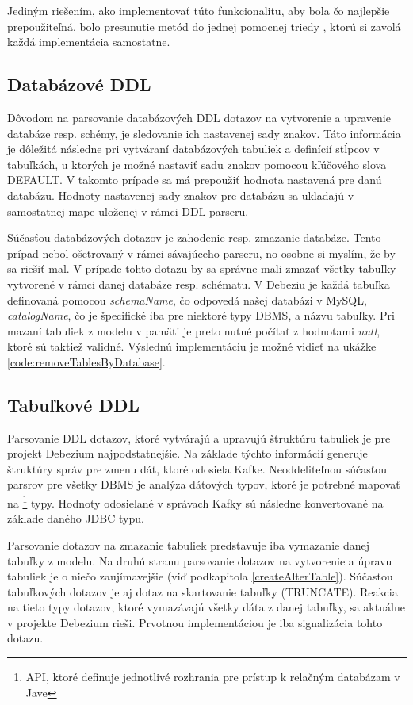 Jediným riešením, ako implementovať túto funkcionalitu, aby bola čo najlepšie prepoužiteľná, bolo presunutie metód do jednej pomocnej triedy , ktorú si zavolá každá implementácia samostatne.

\subsection{Databázové DDL}
Dôvodom na parsovanie databázových DDL dotazov na vytvorenie a upravenie databáze resp. schémy, je sledovanie ich nastavenej sady znakov. Táto informácia je dôležitá následne pri vytváraní databázových tabuliek a definícií stĺpcov v tabuľkách, u ktorých je možné nastaviť sadu znakov pomocou kľúčového slova DEFAULT. V takomto prípade sa má prepoužiť hodnota nastavená pre danú databázu\cite{mysql:reference_manual}. Hodnoty nastavenej sady znakov pre databázu sa ukladajú v samostatnej mape uloženej v rámci DDL parseru.

Súčasťou databázových dotazov je zahodenie resp. zmazanie databáze. Tento prípad nebol ošetrovaný v rámci sávajúceho parseru, no osobne si myslím, že by sa riešiť mal. V prípade tohto dotazu by sa správne mali zmazať všetky tabuľky vytvorené v rámci danej databáze resp. schématu. V Debeziu je každá tabuľka definovaná pomocou \textit{schemaName}, čo odpovedá našej databázi v MySQL, \textit{catalogName}, čo je špecifické iba pre niektoré typy DBMS, a názvu tabuľky. Pri mazaní tabuliek z modelu v pamäti je preto nutné počítať z hodnotami \textit{null}, ktoré sú taktiež validné. Výslednú implementáciu je možné vidieť na ukážke \ref{code:removeTablesByDatabase}.

\subsection{Tabuľkové DDL}
Parsovanie DDL dotazov, ktoré vytvárajú a upravujú štruktúru tabuliek je pre projekt Debezium najpodstatnejšie. Na základe týchto informácií generuje štruktúry správ pre zmenu dát, ktoré odosiela Kafke. Neoddeliteľnou súčasťou parsrov pre všetky DBMS je analýza dátových typov, ktoré je potrebné mapovať na \footnote{API, ktoré definuje jednotlivé rozhrania pre prístup k relačným databázam v Jave} typy. Hodnoty odosielané v správach Kafky sú následne konvertované na základe daného JDBC typu.

Parsovanie dotazov na zmazanie tabuliek predstavuje iba vymazanie danej tabuľky z modelu. Na druhú stranu parsovanie dotazov na vytvorenie a úpravu tabuliek je o niečo zaujímavejšie (viď podkapitola \ref{createAlterTable}). Súčasťou tabuľkových dotazov je aj dotaz na skartovanie tabuľky (TRUNCATE). Reakcia na tieto typy dotazov, ktoré vymazávajú všetky dáta z danej tabuľky, sa aktuálne v projekte Debezium rieši. Prvotnou implementáciou je iba signalizácia tohto dotazu.

